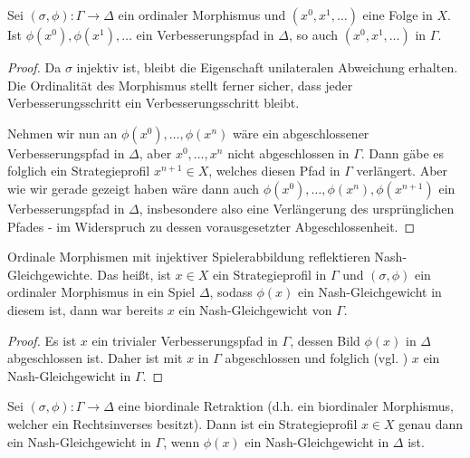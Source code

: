 
\begin{prop}
	Sei $(\sigma, \phi): \Gamma \to \Delta$ ein ordinaler Morphismus und $(x^0, x^1, \dots)$ eine Folge in $X$. Ist $\phi(x^0), \phi(x^1), \dots$ ein Verbesserungspfad in $\Delta$, so auch $(x^0, x^1, \dots)$ in $\Gamma$. 
\end{prop}

\begin{proof}
	Da $\sigma$ injektiv ist, bleibt die Eigenschaft unilateralen Abweichung erhalten. Die Ordinalität des Morphismus stellt ferner sicher, dass jeder Verbesserungsschritt ein Verbesserungsschritt bleibt.
	
	Nehmen wir nun an $\phi(x^0), \dots, \phi(x^n)$ wäre ein abgeschlossener Verbesserungspfad in $\Delta$, aber $x^0, \dots, x^n$ nicht abgeschlossen in $\Gamma$. Dann gäbe es folglich ein Strategieprofil $x^{n+1} \in X$, welches diesen Pfad in $\Gamma$ verlängert. Aber wie wir gerade gezeigt haben wäre dann auch $\phi(x^0), \dots, \phi(x^n), \phi(x^{n+1})$ ein Verbesserungspfad in $\Delta$, insbesondere also eine Verlängerung des ursprünglichen Pfades - im Widerspruch zu dessen vorausgesetzter Abgeschlossenheit.
\end{proof}

\begin{kor}\label{kor:ReflektNG}
	Ordinale Morphismen mit injektiver Spielerabbildung reflektieren Nash-Gleichgewichte. Das heißt, ist $x \in X$ ein Strategieprofil in $\Gamma$ und $(\sigma, \phi)$ ein ordinaler Morphismus in ein Spiel $\Delta$, sodass $\phi(x)$ ein Nash-Gleichgewicht in diesem ist, dann war bereits $x$ ein Nash-Gleichgewicht von $\Gamma$.
\end{kor}

\begin{proof}
	Es ist $x$ ein trivialer Verbesserungspfad in $\Gamma$, dessen Bild $\phi(x)$ in $\Delta$ abgeschlossen ist. Daher ist mit   $x$ in $\Gamma$ abgeschlossen und folglich (vgl. ) $x$ ein Nash-Gleichgewicht in $\Gamma$.
\end{proof}

\begin{prop}\label{prop:NGerhalten}
	Sei $(\sigma, \phi): \Gamma \to \Delta$ eine biordinale Retraktion (d.h. ein biordinaler Morphismus, welcher ein Rechtsinverses besitzt). Dann ist ein Strategieprofil $x \in X$ genau dann ein Nash-Gleichgewicht in $\Gamma$, wenn $\phi(x)$ ein Nash-Gleichgewicht in $\Delta$ ist.
\end{prop}

